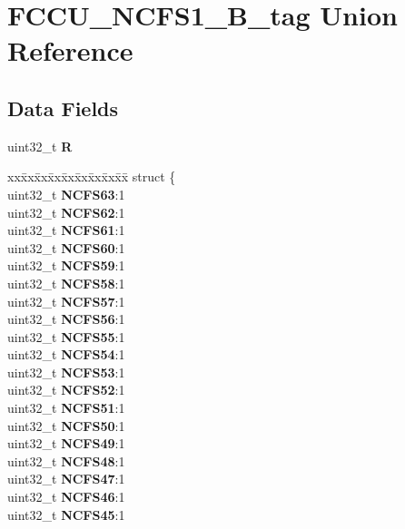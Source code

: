 \hypertarget{unionFCCU__NCFS1__32B__tag}{}\section{F\+C\+C\+U\+\_\+\+N\+C\+F\+S1\+\_\+B\+\_\+tag Union Reference}
\label{unionFCCU__NCFS1__32B__tag}
\subsection*{Data Fields}
\begin{DoxyCompactItemize}
\item 
\mbox{\label{unionFCCU__NCFS1__32B__tag_af46a0ca0442eb77fcd1057f1fd5d3850}} 
uint32\+\_\+t {\bfseries R}
\item 
\mbox{\label{unionFCCU__NCFS1__32B__tag_a42d8f8fb853027df032eb9a31a64a43e}} 
\begin{tabbing}
xx\=xx\=xx\=xx\=xx\=xx\=xx\=xx\=xx\=\kill
struct \{\\
\>uint32\_t {\bfseries NCFS63}:1\\
\>uint32\_t {\bfseries NCFS62}:1\\
\>uint32\_t {\bfseries NCFS61}:1\\
\>uint32\_t {\bfseries NCFS60}:1\\
\>uint32\_t {\bfseries NCFS59}:1\\
\>uint32\_t {\bfseries NCFS58}:1\\
\>uint32\_t {\bfseries NCFS57}:1\\
\>uint32\_t {\bfseries NCFS56}:1\\
\>uint32\_t {\bfseries NCFS55}:1\\
\>uint32\_t {\bfseries NCFS54}:1\\
\>uint32\_t {\bfseries NCFS53}:1\\
\>uint32\_t {\bfseries NCFS52}:1\\
\>uint32\_t {\bfseries NCFS51}:1\\
\>uint32\_t {\bfseries NCFS50}:1\\
\>uint32\_t {\bfseries NCFS49}:1\\
\>uint32\_t {\bfseries NCFS48}:1\\
\>uint32\_t {\bfseries NCFS47}:1\\
\>uint32\_t {\bfseries NCFS46}:1\\
\>uint32\_t {\bfseries NCFS45}:1\\

\end{tabbing}
\end{DoxyCompactItemize}
